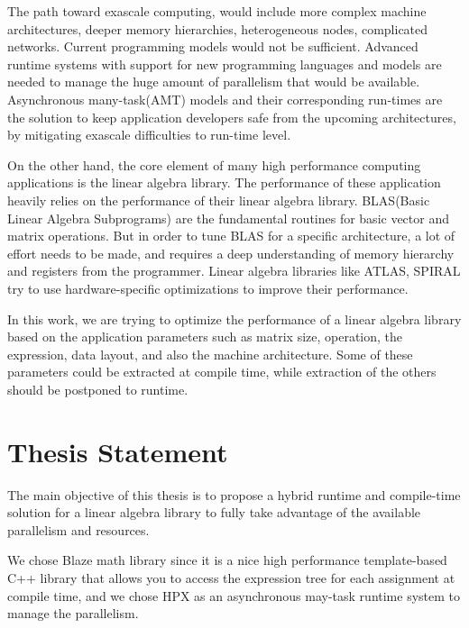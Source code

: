 The path toward exascale computing, would include more complex machine architectures, deeper memory hierarchies, heterogeneous nodes, complicated networks\cite{grubel2016using}.  Current programming models would not be sufficient. Advanced runtime systems with support for new programming languages and models are needed to manage the huge amount of parallelism that would be available\cite{kaiser2014hpx}.
Asynchronous many-task(AMT) models and their corresponding run-times are the solution to keep application developers safe from the upcoming architectures, by mitigating exascale difficulties to run-time level\cite{bennett2015asynchronous}.

On the other hand, the core element of many high performance computing applications is the linear algebra library. The performance of these application heavily relies on the performance of their linear algebra library. BLAS(Basic Linear Algebra Subprograms) are the fundamental routines for basic vector and matrix operations. But in order to tune BLAS for a specific architecture, a lot of effort needs to be made, and requires a deep understanding of memory hierarchy and registers from the programmer\cite{whaley1998automatically}. 
Linear algebra libraries like ATLAS\cite{whaley1998automatically}, SPIRAL\cite{puschel2005spiral} try to use hardware-specific optimizations to improve their performance.


In this work, we are trying to optimize the performance of a linear algebra library based on the application parameters such as matrix size, operation, the expression, data layout, and also the machine architecture. Some of these parameters could be extracted at compile time, while extraction of the others should be postponed to runtime.


\vspace{\baselineskip}
\section{Thesis Statement}
The main objective of this thesis is to propose a hybrid runtime and compile-time solution for a linear algebra library to fully take advantage of the available parallelism and resources. 

We chose Blaze math library since it is a nice high performance template-based C++ library that allows you to access the expression tree for each assignment at compile time, and we chose HPX as an asynchronous may-task runtime system to manage the parallelism. 

